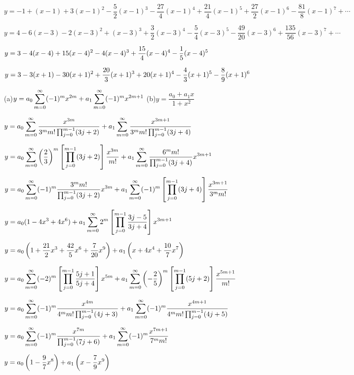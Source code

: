 $y=-1+(x-1)+3(x-1)^2-\dfrac{5}{2}(x-1)^3-\dfrac{27}{4}(x-1)^4+\dfrac{21}{4}(x-1)^5
+\dfrac{27}{2}(x-1)^6-\dfrac{81}{8}(x-1)^7+\cdots$

$y=4-6(x-3)-2(x-3)^2+(x-3)^3+\dfrac{3}{2}(x-3)^4-\dfrac{5}{4}(x-3)^5-
\dfrac{49}{20}(x-3)^6+\dfrac{135}{56}(x-3)^7+\cdots$

$y=\displaystyle{3-4(x-4)+15(x-4)^2-4(x-4)^3+\frac{15}{4}(x-4)^4-\frac{1}{5}(x-4)^5}$%

$y=\displaystyle{3-3(x+1)-30(x+1)^2+\frac{20}{3}(x+1)^3+20(x+1)^4-\frac{4}{3}(x+1)^5-\frac{8}{9}(x+1)^6}$  %

(a)$y=\displaystyle{a_0\sum_{m=0}^\infty(-1)^m
x^{2m}+a_1\sum_{m=0}^\infty(-1)^mx^{2m+1}}$
(b)$y=\dfrac{a_0+a_1x}{1+x^2}$

$y=\displaystyle{a_0\sum_{m=0}^\infty
\frac{x^{3m}}{3^mm!\prod_{j=0}^{m-1}(3j+2)}+a_1\sum_{m=0}^\infty
\frac{x^{3m+1}}{3^mm!\prod_{j=0}^{m-1}(3j+4)}}$

$y=\displaystyle{a_0\sum_{m=0}^\infty
\left(\frac23\right)^m\left[\prod_{j=0}^{m-1}(3j+2)\right]\frac{x^{3m}}{m!}
+a_1\sum_{m=0}^\infty\frac{6^mm!}{\prod_{j=0}^{m-1}(3j+4)}x^{3m+1}}$

$y=\displaystyle{a_0\sum_{m=0}^\infty
(-1)^m\frac{3^mm!}{\prod_{j=0}^{m-1}(3j+2)}x^{3m}
+a_1\sum_{m=0}^\infty
(-1)^m\left[\prod_{j=0}^{m-1}(3j+4)\right]\frac{x^{3m+1}}{3^mm!}}$

$y=\displaystyle{a_0(1-4x^3+4x^6)+a_1\sum_{m=0}^\infty
2^m\left[\prod_{j=0}^{m-1}\frac{3j-5}{3j+4}\right]x^{3m+1}}$

$y=\displaystyle{a_0\left(1+\frac{21}{2}x^3+\frac{42}{5}x^6+\frac{7}{20}x^9\right)
+a_1\left(x+4x^4+\frac{10}{7}x^7\right)}$

$y=\displaystyle{a_0\sum_{m=0}^\infty
(-2)^m\left[\prod_{j=0}^{m-1}\frac{5j+1}{5j+4}\right]x^{5m}+
a_1\sum_{m=0}^\infty
\left(-\frac{2}{5}\right)^m\left[\prod_{j=0}^{m-1}(5j+2)\right]\frac{x^{5m+1}}{m!}}$

$y=\displaystyle{a_0\sum_{m=0}^\infty
(-1)^m\frac{x^{4m}}{4^mm!\prod_{j=0}^{m-1}(4j+3)}+a_1\sum_{m=0}^\infty
(-1)^m\frac{x^{4m+1}}{4^mm!\prod_{j=0}^{m-1}(4j+5)}}$

$y=\displaystyle{a_0\sum_{m=0}^\infty(-1)^m\frac{x^{7m}}{\prod_{j=0}^{m-1}(7j+6)}+
a_1\sum_{m=0}^\infty(-1)^m\frac{x^{7m+1}}{7^mm!}}$

$y=\displaystyle{a_0\left(1-\frac{9}{7}x^8\right)+a_1\left(x-\frac{7}{9}x^9\right)}$

